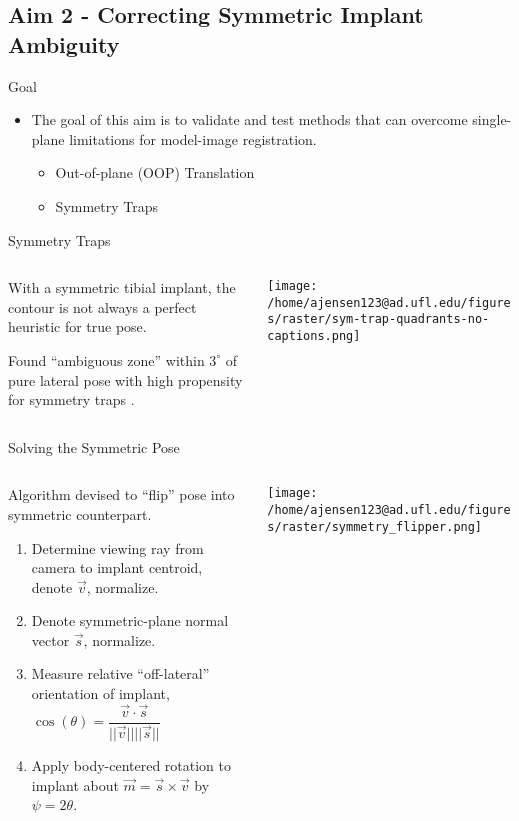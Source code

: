 \documentclass[presentation, aspectratio=1610]{beamer}
\begin{document}
\subsection{Aim 2 - Correcting Symmetric Implant Ambiguity}
\label{sec:orgce4bf55}
\begin{frame}[label={sec:orgacc31b9}]{Goal}
\begin{itemize}
\item The goal of this aim is to validate and test methods that can overcome single-plane limitations for model-image registration.
\begin{itemize}
\item Out-of-plane (OOP) Translation
\item Symmetry Traps
\end{itemize}
\end{itemize}
\end{frame}
\begin{frame}[label={sec:org67836da}]{Symmetry Traps}
\begin{columns}
\begin{column}{0.5\columnwidth}
With a symmetric tibial implant, the contour is not always a perfect heuristic for true pose.

Found ``ambiguous zone'' within \(3^{\circ}\) of pure lateral pose with high propensity for symmetry traps \autocite{jensenJointTrackMachine2023}.
\end{column}
\begin{column}{0.6\columnwidth}
\begin{center}
\texttt{[image: /home/ajensen123@ad.ufl.edu/figures/raster/sym-trap-quadrants-no-captions.png]}
\end{center}
\end{column}
\end{columns}
\end{frame}
\begin{frame}[label={sec:org5d3094a}]{Solving the Symmetric Pose}
\begin{columns}
\begin{column}{0.55\columnwidth}
Algorithm devised to ``flip'' pose into symmetric counterpart.
\begin{enumerate}
\item Determine viewing ray from camera to implant centroid, denote \(\vec{v}\), normalize.
\item Denote symmetric-plane normal vector \(\vec{s}\), normalize.
\item Measure relative ``off-lateral'' orientation of implant, \(\cos(\theta) = \dfrac{\vec{v} \cdot \vec{s}}{||\vec{v} || ||\vec{s} || }\)
\item Apply body-centered rotation to implant about \(\vec{m} = \vec{s} \times \vec{v}\) by \(\psi = 2\theta\).
\end{enumerate}
\end{column}
\begin{column}{0.5\columnwidth}
\begin{center}
\texttt{[image: /home/ajensen123@ad.ufl.edu/figures/raster/symmetry\_flipper.png]}
\end{center}
\end{column}
\end{columns}
\end{frame}
\end{document}
